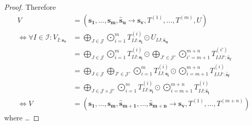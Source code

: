 \begin{proof}
    Therefore
    \begin{align*}
        V                                               & = (\bm{s_1},\dots,\bm{s_m}, \bm{\hat{s}_u} \rightarrow \bm{s_v}, T^{(1)},\dots,T^{(m)}, U)                                                                                                                   \\
        \iff \forall I \in \mathcal{I}: V_{I: \bm{s_v}} & = \bigoplus\limits_{J \in \mathcal{J}} \bigodot\limits_{i = 1}^{m} T^{(i)}_{IJ:\bm{s_i}} \odot U_{IJ:\bm{\hat{s}_u}}                                                                                         \\
                                                        & = \bigoplus\limits_{J \in \mathcal{J}} \bigodot\limits_{i = 1}^{m} T^{(i)}_{IJ:\bm{s_i}} \odot \bigoplus\limits_{J' \in \mathcal{J}'} \bigodot\limits_{i' = m + 1}^{m + n} T^{(i')}_{IJJ':\bm{\hat{s}_{i'}}} \\
                                                        & = \bigoplus\limits_{J \in \mathcal{J}} \bigoplus\limits_{J' \in \mathcal{J}'} \bigodot\limits_{i = 1}^{m} T^{(i)}_{IJ:\bm{s_i}} \odot \bigodot\limits_{i = m + 1}^{m + n} T^{(i)}_{IJJ':\bm{\hat{s}_{i'}}}   \\
                                                        & = \bigoplus\limits_{J \in \mathcal{J} \times \mathcal{J}'} \bigodot\limits_{i = 1}^{m} T^{(i)}_{IJ:\bm{s_i}} \odot \bigodot\limits_{i = m + 1}^{m + n} T^{(i)}_{IJ:\bm{\hat{s}_i}}                                                                                       \\
        \iff V                                          & = (\bm{s_1}, \dots, \bm{s_m}, \bm{\hat{s}_{m + 1}}, \dots, \bm{\hat{s}_{m + n}} \rightarrow \bm{s_v}, T^{(1)}, \dots, T^{(m + n)})
    \end{align*}
    where \dots
\end{proof}


